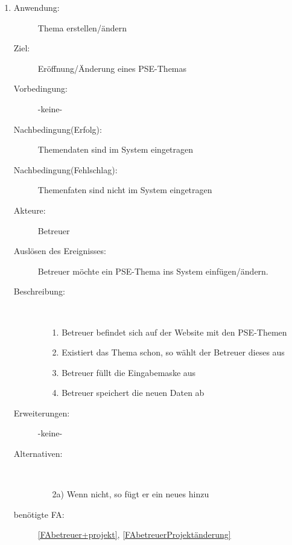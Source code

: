\documentclass[parskip=full]{scrartcl}
\newcommand{\swtLabel}[1]{\textbf{/#1\arabic*0/}}
\begin{document}
\begin{enumerate} [label=\swtLabel{B}]
  
  \item
	\begin{description}
  		\item[Anwendung:] Thema erstellen/ändern
  		\item[Ziel:] Eröffnung/Änderung eines PSE-Themas
  		\item[Vorbedingung:] -keine-
  		\item[Nachbedingung(Erfolg):] Themendaten sind im System eingetragen
  		\item[Nachbedingung(Fehlschlag):] Themenfaten sind nicht im System
  		eingetragen
  		\item[Akteure:] Betreuer
  		\item[Auslösen des Ereignisses:] Betreuer möchte ein PSE-Thema ins System
  		einfügen/ändern.
  		\item[Beschreibung:]~
  	\begin{enumerate}
  	  \item[1.] Betreuer befindet sich auf der Website mit den PSE-Themen
  	  \item[2.] Existiert das Thema schon, so wählt der Betreuer dieses aus
  	  \item[3.] Betreuer füllt die Eingabemaske aus
  	  \item[4.] Betreuer speichert die neuen Daten ab
  	\end{enumerate}
  	\item[Erweiterungen:] -keine-
  	\item[Alternativen:]~
  	\begin{enumerate}
  	  \item[2a)] Wenn nicht, so fügt er ein neues hinzu
  	\end{enumerate}  
  	\item[benötigte FA:] \ref{FAbetreuer+projekt}, \ref{FAbetreuerProjektänderung}
  \end{description}


\end{enumerate}
\end{document}
